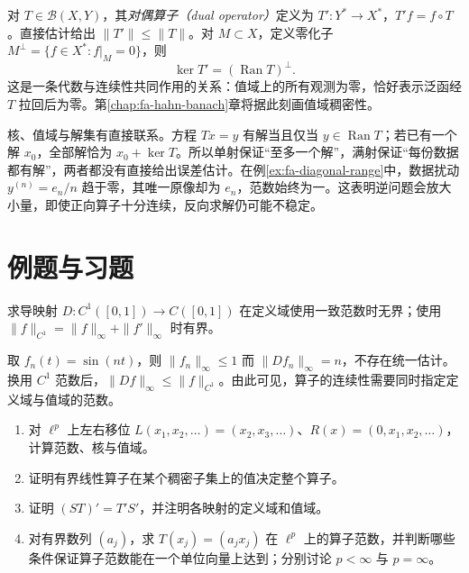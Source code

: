 对 $T\in\mathcal B(X,Y)$，其\emph{对偶算子（dual operator）}定义为 $T':Y^*\to X^*$，$T'f=f\circ T$。直接估计给出 $\|T'\|\leq\|T\|$。对 $M\subset X$，定义零化子 $M^\perp=\{f\in X^*:f|_M=0\}$，则
\[
 \ker T'=(\operatorname{Ran}T)^\perp.
\]
这是一条代数与连续性共同作用的关系：值域上的所有观测为零，恰好表示泛函经 $T$ 拉回后为零。第\ref{chap:fa-hahn-banach}章将据此刻画值域稠密性。

核、值域与解集有直接联系。方程 $Tx=y$ 有解当且仅当 $y\in\operatorname{Ran}T$；若已有一个解 $x_0$，全部解恰为 $x_0+\ker T$。所以单射保证“至多一个解”，满射保证“每份数据都有解”，两者都没有直接给出误差估计。在例\ref{ex:fa-diagonal-range}中，数据扰动 $y^{(n)}=e_n/n$ 趋于零，其唯一原像却为 $e_n$，范数始终为一。这表明逆问题会放大小量，即使正向算子十分连续，反向求解仍可能不稳定。

\section{例题与习题}
\begin{example}[求导与定义域范数]
求导映射 $D:C^1([0,1])\to C([0,1])$ 在定义域使用一致范数时无界；使用 $\|f\|_{C^1}=\|f\|_\infty+\|f'\|_\infty$ 时有界。
\end{example}
\begin{solve}
取 $f_n(t)=\sin(nt)$，则 $\|f_n\|_\infty\leq1$ 而 $\|Df_n\|_\infty=n$，不存在统一估计。换用 $C^1$ 范数后，$\|Df\|_\infty\leq\|f\|_{C^1}$。由此可见，算子的连续性需要同时指定定义域与值域的范数。
\end{solve}
\begin{enumerate}
 \item 对 $\ell^p$ 上左右移位 $L(x_1,x_2,\ldots)=(x_2,x_3,\ldots)$、$R(x)=(0,x_1,x_2,\ldots)$，计算范数、核与值域。
 \item 证明有界线性算子在某个稠密子集上的值决定整个算子。
 \item 证明 $(ST)'=T'S'$，并注明各映射的定义域和值域。
 \item 对有界数列 $(a_j)$，求 $T(x_j)=(a_jx_j)$ 在 $\ell^p$ 上的算子范数，并判断哪些条件保证算子范数能在一个单位向量上达到；分别讨论 $p<\infty$ 与 $p=\infty$。
\end{enumerate}

